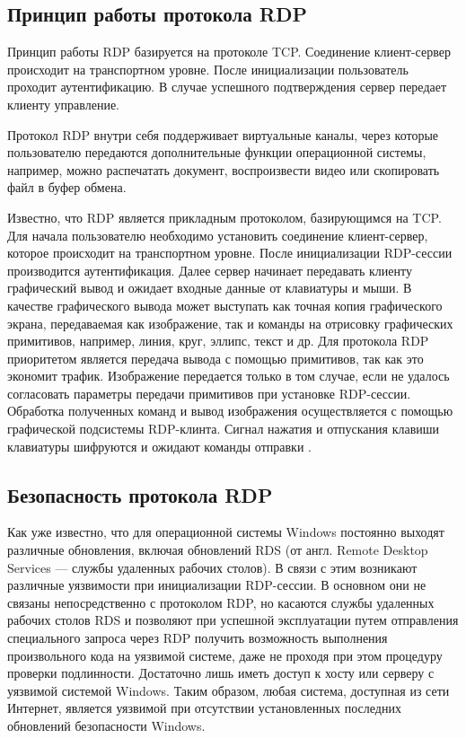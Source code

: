 \documentclass[bachelor, och, coursework]{SCWorks}
\begin{document}
  \subsection{Принцип работы протокола RDP}

  Принцип работы RDP базируется на протоколе TCP. Соединение клиент-сервер происходит на транспортном уровне. После инициализации пользователь 
  проходит аутентификацию. В случае успешного подтверждения сервер передает клиенту управление.

  Протокол RDP внутри себя поддерживает виртуальные каналы, через которые пользователю передаются дополнительные функции операционной системы,
  например, можно распечатать документ, воспроизвести видео или скопировать файл в буфер обмена.

  Известно, что RDP является прикладным протоколом, базирующимся на TCP. Для начала пользователю необходимо установить соединение клиент-сервер, которое
  происходит на транспортном уровне. После инициализации RDP-сессии производится аутентификация. Далее сервер начинает передавать клиенту графический вывод и
  ожидает входные данные от клавиатуры и мыши. В качестве графического вывода может выступать как точная копия графического экрана, передаваемая как изображение,
  так и команды на отрисовку графических примитивов, например, линия, круг, эллипс, текст и др. Для протокола RDP приоритетом является передача вывода с помощью
  примитивов, так как это экономит трафик. Изображение передается только в том случае, если не удалось согласовать параметры передачи примитивов при установке 
  RDP-сессии. Обработка полученных команд и вывод изображения осуществляется с помощью графической подсистемы RDP-клинта. Сигнал нажатия и отпускания клавиши клавиатуры
  шифруются и ожидают команды отправки \cite{3}.
  
  \subsection{Безопасность протокола RDP}

  Как уже известно, что для операционной системы Windows постоянно выходят различные обновления, включая обновлений RDS (от англ. Remote Desktop Services --- службы 
  удаленных рабочих столов). В связи с этим возникают различные уязвимости при инициализации RDP-сессии. В основном они не связаны непосредственно с
  протоколом RDP, но касаются службы удаленных рабочих столов RDS и позволяют при успешной эксплуатации путем отправления специального запроса через RDP
  получить возможность выполнения произвольного кода на уязвимой системе, даже не проходя при этом процедуру проверки подлинности. Достаточно лишь иметь доступ
  к хосту или серверу с уязвимой системой Windows. Таким образом, любая система, доступная из сети Интернет, является уязвимой при отсутствии установленных
  последних обновлений безопасности Windows.
  
\end{document}

